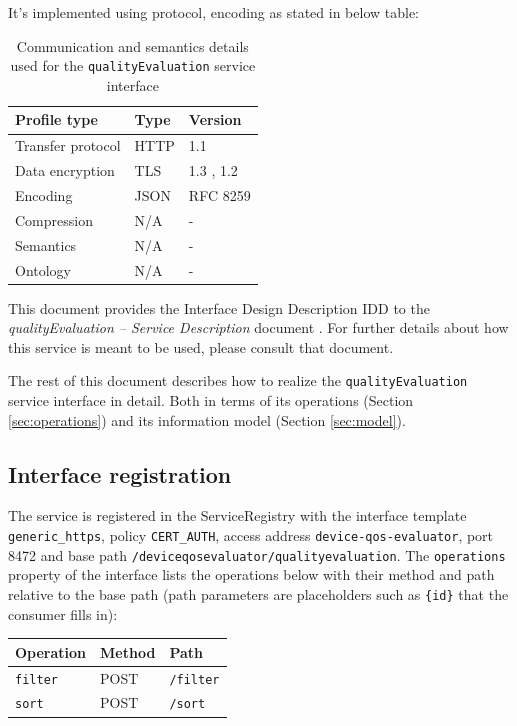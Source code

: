 \documentclass[a4paper]{arrowhead}
\begin{document}
It's implemented using protocol, encoding as stated in below table:
\begin{table}[ht!]
  \centering
  \begin{tabular}{|l|l|l|}
    \hline
    \rowcolor{gray!33} Profile type & Type & Version \\ \hline
    Transfer protocol & HTTP & 1.1 \cite{rfc9112} \\ \hline
    Data encryption & TLS & 1.3 \cite{rfc8446}, 1.2 \cite{rfc5246} \\ \hline
    Encoding & JSON & RFC 8259 \cite{rfc8259} \\ \hline
    Compression & N/A & - \\ \hline
    Semantics & N/A & - \\ \hline
    Ontology & N/A & - \\ \hline
  \end{tabular}
  \caption{Communication and semantics details used for the \texttt{qualityEvaluation} service interface}
  \label{tab:comunication_semantics_profile}
\end{table}

This document provides the Interface Design Description IDD to the \textit{qualityEvaluation -- Service Description} document \cite{dqe-qualityEvaluation-sd}.
For further details about how this service is meant to be used, please consult that document.

The rest of this document describes how to realize the \texttt{qualityEvaluation} service
interface in detail. Both in terms of its operations (Section \ref{sec:operations}) and its information model (Section \ref{sec:model}).

\subsection{Interface registration}

The service is registered in the ServiceRegistry with the interface template \texttt{generic\_\allowbreak{}https}, policy \texttt{CERT\_\allowbreak{}AUTH}, access address \texttt{device-\allowbreak{}qos-\allowbreak{}evaluator}, port 8472 and base path \texttt{/\allowbreak{}deviceqosevaluator/\allowbreak{}qualityevaluation}. The \texttt{operations} property of the interface lists the operations below with their method and path relative to the base path (path parameters are placeholders such as \texttt{\{id\}} that the consumer fills in):

\noindent\begin{longtable}{| p{5.2cm} | p{1.6cm} | p{8.4cm} |} \hline
\rowcolor{gray!33} Operation & Method & Path \\ \hline \endhead
\texttt{filter} & POST & \texttt{/\allowbreak{}filter} \\ \hline
\texttt{sort} & POST & \texttt{/\allowbreak{}sort} \\ \hline
\end{longtable}
\end{document}
